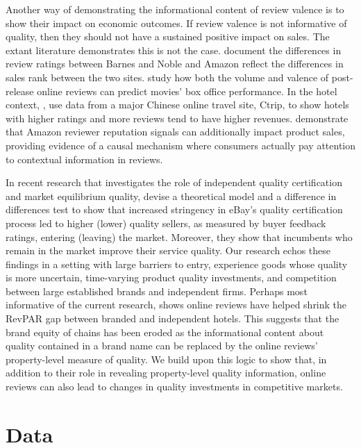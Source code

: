 \documentclass{informs_mod} %
\begin{document}
Another way of demonstrating the informational content of review valence is to show their impact on economic outcomes. If review valence is not informative of quality, then they should not have a sustained positive impact on sales. The extant literature demonstrates this is not the case. \citet{chevalier2006effect} document the differences in review ratings between Barnes and Noble and Amazon reflect the differences in sales rank between the two sites. \citet{dellarocas2007exploring} study how both the volume and valence of post-release online reviews can predict movies' box office performance. In the hotel context, \citet{ye2009impact}, use data from a major Chinese online travel site, Ctrip, to show hotels with higher ratings and more reviews tend to have higher revenues. \citet{hu2008online} demonstrate that Amazon reviewer reputation signals can additionally impact product sales, providing evidence of a causal mechanism where consumers actually pay attention to contextual information in reviews. 

In recent research that investigates the role of independent quality certification and market equilibrium quality, \citet{hui2018certification} devise a theoretical model and a difference in differences test to show that increased stringency in eBay's quality certification process led to higher (lower) quality sellers, as measured by buyer feedback ratings, entering (leaving) the market. Moreover, they show that incumbents who remain in the market improve their service quality. Our research echos these findings in a setting with large barriers to entry, experience goods whose quality is more uncertain, time-varying product quality investments, and competition between large established brands and independent firms. Perhaps most informative of the current research, \citet{hollenbeck2018} shows online reviews have helped shrink the RevPAR gap between branded and independent hotels. This suggests that the brand equity of chains has been eroded as the informational content about quality contained in a brand name can be replaced by the online reviews' property-level measure of quality. We build upon this logic to show that, in addition to their role in revealing property-level quality information, online reviews can also lead to changes in quality investments in competitive markets.

\section{Data}\label{sec:data}
\end{document}
